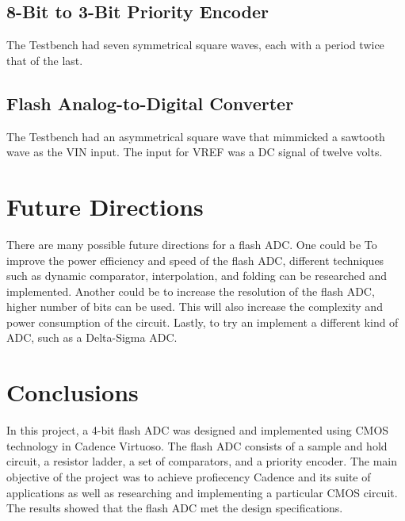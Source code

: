 \documentclass[conference]{IEEEtran}
\begin{document}
\subsection{8-Bit to 3-Bit Priority Encoder}

The Testbench had seven symmetrical square waves, each with a period twice that of the last.

\subsection{Flash Analog-to-Digital Converter}

The Testbench had an asymmetrical square wave that mimmicked a sawtooth wave as the VIN input. The input for VREF was a DC signal of twelve volts.

\section{Future Directions}

There are many possible future directions for a flash ADC. 
One could be To improve the power efficiency and speed of the flash ADC, different techniques such as dynamic comparator, interpolation, and folding can be researched and implemented.
Another could be to increase the resolution of the flash ADC, higher number of bits can be used. This will also increase the complexity and power consumption of the circuit.
Lastly, to try an implement a different kind of ADC, such as a Delta-Sigma ADC.

\section{Conclusions}

In this project, a 4-bit flash ADC was designed and implemented using CMOS technology in Cadence Virtuoso. The flash ADC consists of a sample and hold circuit, a resistor ladder, a set of comparators, and a priority encoder.
The main objective of the project was to achieve profiecency Cadence and its suite of applications as well as researching and implementing a particular CMOS circuit.
The results showed that the flash ADC met the design specifications.
\end{document}
